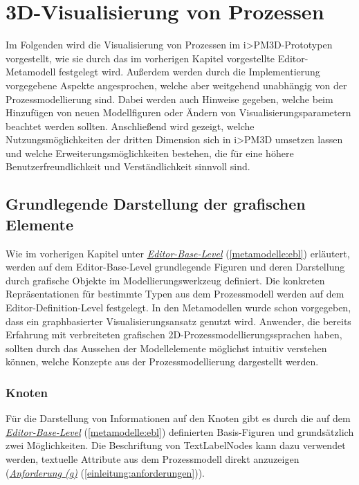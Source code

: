 \documentclass[a4paper,10pt]{sphinxmanual}
\begin{document}
\chapter{3D-Visualisierung von Prozessen}
\label{visualisierung::doc}\label{visualisierung:visualisierung}\label{visualisierung:d-visualisierung-von-prozessen}
Im Folgenden wird die Visualisierung von Prozessen im i\textgreater{}PM3D-Prototypen vorgestellt, wie sie durch das im vorherigen Kapitel vorgestellte Editor-Metamodell festgelegt wird.
Außerdem werden durch die Implementierung vorgegebene Aspekte angesprochen, welche aber weitgehend unabhängig von der Prozessmodellierung sind.
Dabei werden auch Hinweise gegeben, welche beim Hinzufügen von neuen Modellfiguren oder Ändern von Visualisierungsparametern beachtet werden sollten.
Anschließend wird gezeigt, welche Nutzungsmöglichkeiten der dritten Dimension sich in i\textgreater{}PM3D umsetzen lassen und welche Erweiterungsmöglichkeiten bestehen, die für eine höhere Benutzerfreundlichkeit und Verständlichkeit sinnvoll sind.


\section{Grundlegende Darstellung der grafischen Elemente}
\label{visualisierung:grundlegende-darstellung-der-grafischen-elemente}
Wie im vorherigen Kapitel unter {\hyperref[metamodelle:ebl]{\emph{Editor-Base-Level}}} (\autoref*{metamodelle:ebl}) erläutert, werden auf dem Editor-Base-Level grundlegende Figuren und deren Darstellung durch grafische Objekte im Modellierungswerkzeug definiert.
Die konkreten Repräsentationen für bestimmte Typen aus dem Prozessmodell werden auf dem Editor-Definition-Level festgelegt.
In den Metamodellen wurde schon vorgegeben, dass ein graphbasierter Visualisierungsansatz genutzt wird.
Anwender, die bereits Erfahrung mit verbreiteten grafischen 2D-Prozessmodellierungssprachen haben, sollten durch das Aussehen der Modellelemente möglichst intuitiv verstehen können, welche Konzepte aus der Prozessmodellierung dargestellt werden.


\subsection{Knoten}
\label{visualisierung:knoten}
Für die Darstellung von Informationen auf den Knoten gibt es durch die auf dem {\hyperref[metamodelle:ebl]{\emph{Editor-Base-Level}}} (\autoref*{metamodelle:ebl}) definierten Basis-Figuren  und  grundsätzlich zwei Möglichkeiten.
Die Beschriftung von TextLabelNodes kann dazu verwendet werden, textuelle Attribute aus dem Prozessmodell direkt anzuzeigen ({\hyperref[einleitung:anforderungen]{\emph{Anforderung (g)}}} (\autoref*{einleitung:anforderungen})).
\end{document}
